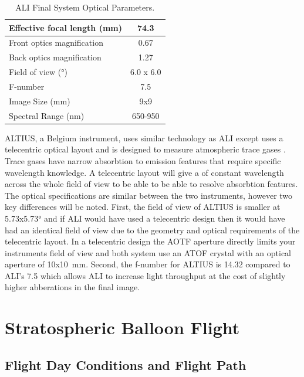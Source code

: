 \documentclass[12pt]{article}
\begin{document}
\begin{table}[!ht]
    \begin{center}
    \begin{tabular}{|l|c|}
      \hline
      Effective focal length (mm) & 74.3 \\
      \hline
      Front optics magnification & 0.67 \\
      \hline
      Back optics magnification & 1.27 \\
      \hline
      Field of view (\si{\degree}) & 6.0 x 6.0 \\
      \hline
      F-number & 7.5 \\
      \hline
      Image Size (mm) & 9x9\\
      \hline
      Spectral Range (nm) & 650-950\\
      \hline
    \end{tabular}
    \end{center}
    \caption{ALI Final System Optical Parameters.}
    \label{tab:3.2:ALISystemParameters}
\end{table}

 ALTIUS, a Belgium instrument, uses similar technology as ALI except uses a telecentric optical layout and is designed to measure atmospheric trace gases \citep{Dekemper2012}. Trace gases have narrow absorbtion to emission features that require specific wavelength knowledge. A telecentric layout will give a of constant wavelength across the whole field of view to be able to be able to resolve absorbtion features. The optical specifications are similar between the two instruments, however two key differences will be noted. First, the field of view of ALTIUS is smaller at 5.73x5.73\si{\degree} and if ALI would have used a telecentric design then it would have had an identical field of view due to the geometry and optical requirements of the telecentric layout. In a telecentric design the AOTF aperture directly limits your instruments field of view and both system use an ATOF crystal with an optical aperture of 10x10~mm. Second, the f-number for ALTIUS is 14.32 compared to ALI's 7.5 which allows ALI to increase light throughput at the cost of slightly higher abberations in the final image.

\section{Stratospheric Balloon Flight}

\subsection{Flight Day Conditions and Flight Path}
\end{document}
